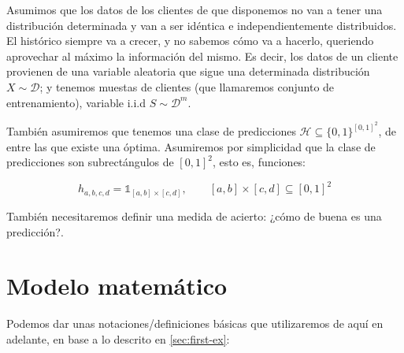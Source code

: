 Asumimos que los datos de los clientes de que disponemos no van a tener una distribución determinada y
van a ser idéntica e independientemente distribuidos. El histórico siempre va a crecer, y no sabemos cómo va a hacerlo, queriendo aprovechar
al máximo la información del mismo. Es decir, los datos de un cliente provienen de una variable aleatoria que sigue una determinada
distribución $X \sim \mathcal{D}$; y tenemos muestas de clientes (que llamaremos conjunto de entrenamiento), variable i.i.d
$S \sim \mathcal{D}^m$. 

También asumiremos que tenemos una clase de predicciones $\mathcal{H} \subseteq \{0,1\}^{[0,1]^2}$, de entre las que existe
una óptima. Asumiremos por simplicidad que la clase de predicciones son subrectángulos de $[0,1]^2$, esto es, funciones:

\[h_{a,b,c,d} = \mathds{1}_{[a,b]\times[c,d]}, \qquad [a,b]\times [c,d] \subseteq [0,1]^2\]


También necesitaremos definir una medida de acierto: ¿cómo de buena es una predicción?.

\section{Modelo matemático}

Podemos dar unas notaciones/definiciones básicas que utilizaremos de aquí en adelante, en base a lo descrito en \ref{sec:first-ex}:

